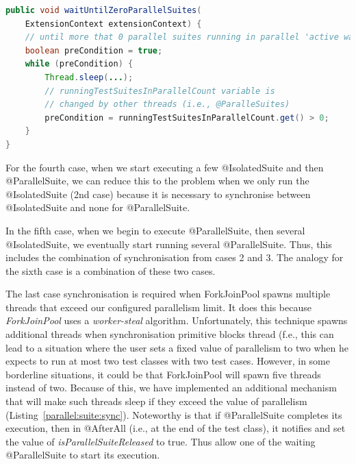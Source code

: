\begin{lstlisting}[language=Java,label=parallelsuite:isolatedsuite:sync,caption=@ParallelSuite and @IsolatedSuite synchronisation mechanism,frame=tb]
public void waitUntilZeroParallelSuites(
    ExtensionContext extensionContext) {
    // until more that 0 parallel suites running in parallel 'active waiting'
    boolean preCondition = true;
    while (preCondition) {
        Thread.sleep(...);
        // runningTestSuitesInParallelCount variable is
        // changed by other threads (i.e., @ParalleSuites)
        preCondition = runningTestSuitesInParallelCount.get() > 0;
    }
}
\end{lstlisting}

For the fourth case, when we start executing a few @IsolatedSuite and then @ParallelSuite, we can reduce this to the
problem when we only run the @IsolatedSuite (2nd case) because it is necessary to synchronise between @IsolatedSuite
and none for @ParallelSuite.

In the fifth case, when we begin to execute @ParallelSuite, then several @IsolatedSuite, we eventually start running several
@ParallelSuite. Thus, this includes the combination of synchronisation from cases 2 and 3.
The analogy for the sixth case is a combination of these two cases.

The last case synchronisation is required when ForkJoinPool spawns multiple threads that exceed our configured parallelism limit.
It does this because \emph{ForkJoinPool} uses a \emph{worker-steal} algorithm. Unfortunately, this technique spawns additional threads when
synchronisation primitive blocks thread (f.e., this can lead to a situation where the user sets a fixed value of parallelism
to two when he expects to run at most two test classes with two test cases. However, in some borderline situations,
it could be that ForkJoinPool will spawn five threads instead of two. Because of this, we have implemented an additional
mechanism that will make such threads sleep if they exceed the value of parallelism (Listing~\ref{parallel:suite:sync}).
Noteworthy is that if @ParallelSuite completes its execution, then in @AfterAll (i.e., at the end of the test class),
it notifies and set the value of \emph{isParallelSuiteReleased} to true. Thus allow one of the waiting @ParallelSuite to start its execution.

